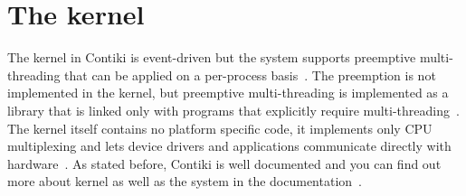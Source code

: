 
\section{The kernel}
The kernel in Contiki is event-driven but the system supports preemptive
multi-threading that can be applied on a per-process basis~\cite{video}.
The preemption is not implemented in the kernel, but
preemptive multi-threading is implemented as a library that is linked only with programs that
explicitly require multi-threading~\cite{paper-contiki}.
The kernel itself contains no platform specific code, it implements only CPU multiplexing and
lets device drivers and applications communicate directly with hardware~\cite{video}.
As stated before, Contiki is well documented and you can find out more about
kernel as well as the system in the documentation~\cite{contiki-docs}.
